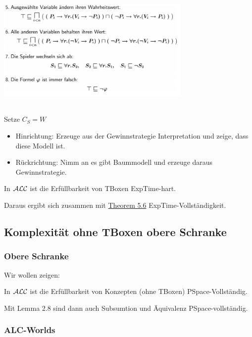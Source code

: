 \includegraphics[width=3.71910in,height=2.33200in]{media/5red3.png}

Setze $C_S = W$ 

\begin{itemize}
\item
  Hinrichtung: Erzeuge aus der Gewinnstrategie Interpretation und zeige, dass diese Modell ist.
\item
  Rückrichtung: Nimm an es gibt Baummodell und erzeuge daraus
  Gewinnstrategie.
\end{itemize}

\begin{theorem}
In $\mathcal{A}\mathcal{L}\mathcal{C}$ ist die Erfüllbarkeit von TBoxen ExpTime-hart.
\end{theorem}

Daraus ergibt sich zusammen mit \protect\hyperlink{theorem-5.6}{Theorem 5.6} ExpTime-Vollständigkeit.

\subsection{Komplexität ohne TBoxen obere
Schranke}\label{komplexituxe4t-ohne-tboxen-obere-schranke}

\subsubsection{Obere Schranke}

Wir wollen zeigen:

\begin{theorem}
In $\mathcal{A}\mathcal{L}\mathcal{C}$ ist die Erfüllbarkeit von Konzepten (ohne TBoxen)
PSpace-Vollständig.
\end{theorem}

Mit Lemma 2.8 sind dann auch Subsumtion und Äquivalenz PSpace-vollständig.

\subsubsection{ALC-Worlds}\label{alc-worlds}

